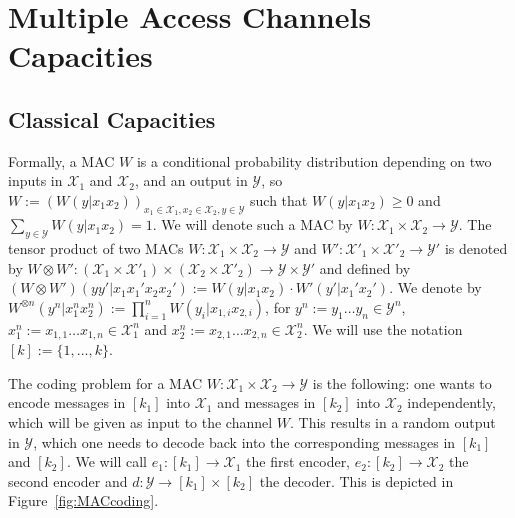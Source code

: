\documentclass[11pt]{article}
\theoremstyle{definition}
\theoremstyle{remark}
\begin{document}
\section{Multiple Access Channels Capacities}
\label{section:capacity}
\subsection{Classical Capacities}
Formally, a MAC $W$ is a conditional probability distribution depending on two inputs in $\mathcal{X}_1$ and $\mathcal{X}_2$, and an output in $\mathcal{Y}$, so $W := \left(W(y|x_1x_2)\right)_{x_1 \in \mathcal{X}_1,x_2  \in \mathcal{X}_2, y \in \mathcal{Y}}$ such that $W(y|x_1x_2) \geq 0$ and $\sum_{y \in \mathcal{Y}} W(y|x_1x_2) = 1$. We will denote such a MAC by $W : \mathcal{X}_1 \times \mathcal{X}_2 \rightarrow \mathcal{Y}$. The tensor product of two MACs $W: \mathcal{X}_1 \times \mathcal{X}_2 \rightarrow \mathcal{Y}$ and $W': \mathcal{X}'_1 \times \mathcal{X}'_2 \rightarrow \mathcal{Y}'$ is denoted by $W \otimes W' : (\mathcal{X}_1 \times \mathcal{X}'_1) \times (\mathcal{X}_2 \times \mathcal{X}'_2) \to \mathcal{Y} \times \mathcal{Y}'$ and defined by $(W \otimes W')(yy'|x_1x_1'x_2x_2') := W(y|x_1x_2) \cdot W'(y'|x_1'x_2')$. We denote by $W^{\otimes n}(y^n|x_1^nx_2^n) := \prod_{i=1}^nW(y_i|x_{1,i}x_{2,i})$, for $y^n := y_1 \ldots y_n \in \mathcal{Y}^n$, $x_1^n := x_{1,1} \ldots x_{1,n} \in \mathcal{X}_1^n$ and $x_2^n := x_{2,1} \ldots x_{2,n} \in \mathcal{X}_2^n$. We will use the notation $[k]:=\{1,\ldots,k\}$.


The coding problem for a MAC $W : \mathcal{X}_1 \times \mathcal{X}_2 \rightarrow \mathcal{Y}$ is the following: one wants to encode messages in $[k_1]$ into $\mathcal{X}_1$ and messages in $[k_2]$ into $\mathcal{X}_2$ independently, which will be given as input to the channel $W$. This results in a random output in $\mathcal{Y}$, which one needs to decode back into the corresponding messages in $[k_1]$ and $[k_2]$. We will call $e_1 : [k_1] \rightarrow \mathcal{X}_1$ the first encoder, $e_2 : [k_2] \rightarrow \mathcal{X}_2$ the second encoder and $d : \mathcal{Y} \rightarrow [k_1] \times [k_2]$ the decoder. This is depicted in Figure~\ref{fig:MACcoding}.
\end{document}
